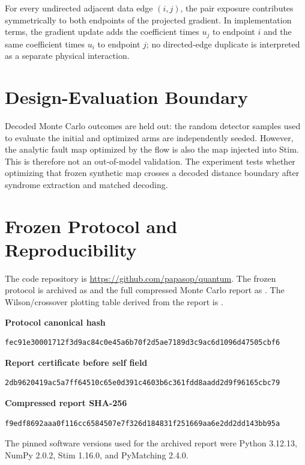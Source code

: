 \documentclass[11pt]{article}
\begin{document}
For every undirected adjacent data edge $(i,j)$, the pair exposure contributes symmetrically to both endpoints of the projected gradient. In implementation terms, the gradient update adds the coefficient times $u_j$ to endpoint $i$ and the same coefficient times $u_i$ to endpoint $j$; no directed-edge duplicate is interpreted as a separate physical interaction.

\section{Design-Evaluation Boundary}
Decoded Monte Carlo outcomes are held out: the random detector samples used to evaluate the initial and optimized arms are independently seeded. However, the analytic fault map optimized by the flow is also the map injected into Stim. This is therefore not an out-of-model validation. The experiment tests whether optimizing that frozen synthetic map crosses a decoded distance boundary after syndrome extraction and matched decoding.

\section{Frozen Protocol and Reproducibility}
The code repository is \url{https://github.com/papasop/quantum}. The frozen protocol is archived as  and the full compressed Monte Carlo report as . The Wilson/crossover plotting table derived from the report is .

\textbf{Protocol canonical hash}
\begin{verbatim}
fec91e30001712f3d9ac84c0e45a6b70f2d5ae7189d3c9ac6d1096d47505cbf6
\end{verbatim}
\textbf{Report certificate before self field}
\begin{verbatim}
2db9620419ac5a7ff64510c65e0d391c4603b6c361fdd8aadd2d9f96165cbc79
\end{verbatim}
\textbf{Compressed report SHA-256}
\begin{verbatim}
f9edf8692aaa0f116cc6584507e7f326d184831f251669aa6e2dd2dd143bb95a
\end{verbatim}

The pinned software versions used for the archived report were Python 3.12.13, NumPy 2.0.2, Stim 1.16.0, and PyMatching 2.4.0.
\end{document}
